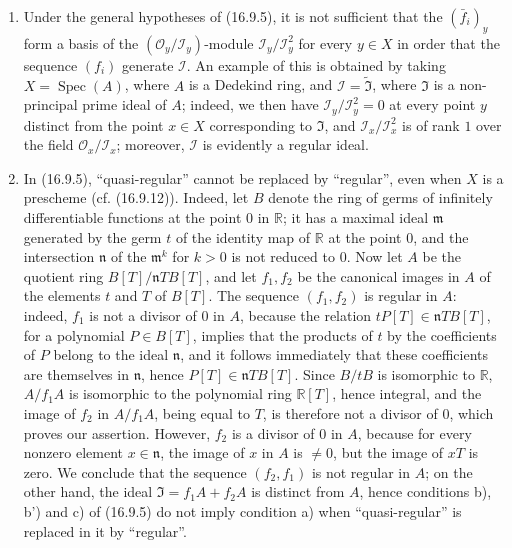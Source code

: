 \begin{remarks}[16.9.6]
\label{IV.16.9.6}
\begin{enumerate}
  \item[(i)] Under the general hypotheses of (16.9.5), it is not sufficient
  that the $(\bar f_i)_y$ form a basis of the
  $(\mathcal{O}_y/\mathscr{I}_y)$-module
  $\mathscr{I}_y/\mathscr{I}_y^2$ for every $y\in X$ in order that the
  sequence $(f_i)$ generate $\mathscr{I}$. An example of this is obtained by
  taking $X=\operatorname{Spec}(A)$, where $A$ is a Dedekind ring, and
  $\mathscr{I}=\widetilde{\mathfrak{I}}$, where $\mathfrak{I}$ is a
  non-principal prime ideal of $A$; indeed, we then have
  $\mathscr{I}_y/\mathscr{I}_y^2=0$ at every point $y$ distinct from the point
  $x\in X$ corresponding to $\mathfrak{I}$, and
  $\mathscr{I}_x/\mathscr{I}_x^2$ is of rank $1$ over the field
  $\mathcal{O}_x/\mathscr{I}_x$; moreover, $\mathscr{I}$ is evidently a
  regular ideal.
  \item[(ii)] In (16.9.5), ``quasi-regular'' cannot be replaced by
  ``regular'', even when $X$ is a prescheme (cf. (16.9.12)).
  Indeed, let $B$ denote the ring of germs of infinitely
  differentiable functions at the point $0$ in $\mathbb{R}$; it has a maximal
  ideal $\mathfrak{m}$ generated by the germ $t$ of the identity map of
  $\mathbb{R}$ at the point $0$, and the intersection $\mathfrak{n}$ of the
  $\mathfrak{m}^k$ for $k>0$ is not reduced to $0$. Now let $A$ be
  the quotient ring $B[T]/\mathfrak{n}TB[T]$, and let $f_1,f_2$ be the
  canonical images in $A$ of the elements $t$ and $T$ of $B[T]$. The sequence
  $(f_1,f_2)$ is regular in $A$: indeed, $f_1$ is not a divisor of
  $0$ in $A$, because the relation $tP[T]\in\mathfrak{n}TB[T]$, for a
  polynomial $P\in B[T]$, implies that the products of $t$ by the coefficients
  of $P$ belong to the ideal $\mathfrak{n}$, and it follows immediately that
  these coefficients are themselves in $\mathfrak{n}$, hence
  $P[T]\in\mathfrak{n}TB[T]$. Since $B/tB$ is isomorphic to $\mathbb{R}$,
  $A/f_1A$ is isomorphic to the polynomial ring $\mathbb{R}[T]$, hence
  integral, and the image of $f_2$ in $A/f_1A$, being equal to $T$, is
  therefore not a divisor of $0$, which proves our assertion. However, $f_2$
  is a divisor of $0$ in $A$, because for every nonzero element
  $x\in\mathfrak{n}$, the image of $x$ in $A$ is $\ne0$, but the image of $xT$
  is zero. We conclude that the sequence $(f_2,f_1)$ is not regular in $A$;
  on the other hand, the ideal $\mathfrak{I}=f_1A+f_2A$ is distinct from $A$,
  hence conditions b), b') and c) of (16.9.5) do not imply condition a)
  when ``quasi-regular'' is replaced in it by ``regular''.
\end{enumerate}
\end{remarks}

